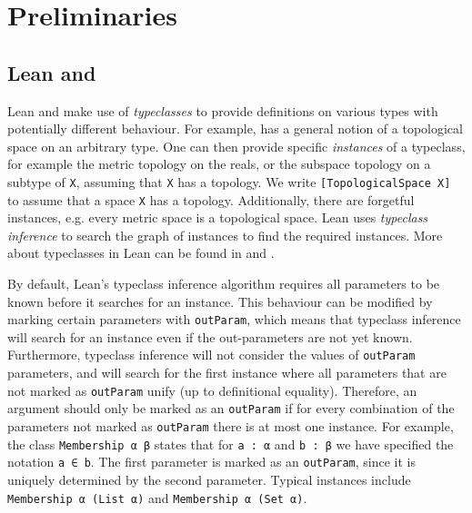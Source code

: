 \section{Preliminaries}

\subsection{Lean and \mathlib}\label{sub:leanandmathlib}

Lean and \mathlib make use of \emph{typeclasses} to provide definitions on various types with potentially different behaviour.
For example, \mathlib has a general notion of a topological space on an arbitrary type.
One can then provide specific \emph{instances} of a typeclass, for example the metric topology on the reals, or the subspace topology on a subtype of \lstinline|X|, assuming that \lstinline|X| has a topology. 
We write \lstinline|[TopologicalSpace X]| to assume that a space \lstinline|X| has a topology.
Additionally, there are forgetful instances, e.g. every metric space is a topological space. %
Lean uses \emph{typeclass inference} to search the graph of instances to find the required instances.
More about typeclasses in Lean can be found in \cite{Selsam2020} and \cite{Baanen2025}.

By default, Lean's typeclass inference algorithm requires all parameters to be known before it searches for an instance. This behaviour can be modified by marking certain parameters with \lstinline|outParam|, which means that typeclass inference will search for an instance even if the out-parameters are not yet known.
Furthermore, typeclass inference will not consider the values of \lstinline|outParam| parameters, and will search for the first instance where all parameters that are not marked as \lstinline|outParam| unify (up to definitional equality).
Therefore, an argument should only be marked as an \lstinline|outParam| if for every combination of the parameters not marked as \lstinline|outParam| there is at most one instance.
For example, the class \lstinline|Membership α β| states that for \lstinline|a : α| and \lstinline|b : β| we have specified the notation \lstinline|a ∈ b|. 
The first parameter is marked as an \lstinline|outParam|, since it is uniquely determined by the second parameter. Typical instances include \lstinline|Membership α (List α)| and \lstinline|Membership α (Set α)|.

